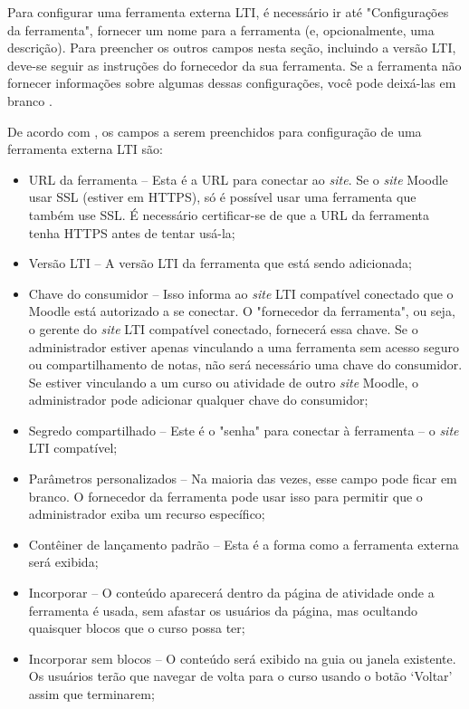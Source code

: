 Para configurar uma ferramenta externa LTI, é necessário ir até "Configurações da ferramenta", fornecer um nome para a ferramenta (e, opcionalmente, uma descrição). Para preencher os outros campos nesta seção, incluindo a versão LTI, deve-se seguir as instruções do fornecedor da sua ferramenta. Se a ferramenta não fornecer informações sobre algumas dessas configurações, você pode deixá-las em branco \cite{moodle}.

De acordo com \textcite{moodle}, os campos a serem preenchidos para configuração de uma ferramenta externa LTI são:

\begin{itemize}
    \item URL da ferramenta – Esta é a URL para conectar ao \textit{site}. Se o \textit{site} Moodle usar SSL (estiver em HTTPS), só é possível usar uma ferramenta que também use SSL. É necessário certificar-se de que a URL da ferramenta tenha HTTPS antes de tentar usá-la;
    \item Versão LTI – A versão LTI da ferramenta que está sendo adicionada; 
    \item Chave do consumidor – Isso informa ao \textit{site} LTI compatível conectado que o Moodle está autorizado a se conectar. O "fornecedor da ferramenta", ou seja, o gerente do \textit{site} LTI compatível conectado, fornecerá essa chave. Se o administrador estiver apenas vinculando a uma ferramenta sem acesso seguro ou compartilhamento de notas, não será necessário uma chave do consumidor. Se estiver vinculando a um curso ou atividade de outro \textit{site} Moodle, o administrador pode adicionar qualquer chave do consumidor;
    \item Segredo compartilhado – Este é o "senha" para conectar à ferramenta – o \textit{site} LTI compatível;
    \item Parâmetros personalizados – Na maioria das vezes, esse campo pode ficar em branco. O fornecedor da ferramenta pode usar isso para permitir que o administrador exiba um recurso específico;
    \item Contêiner de lançamento padrão – Esta é a forma como a ferramenta externa será exibida;
    \item Incorporar – O conteúdo aparecerá dentro da página de atividade onde a ferramenta é usada, sem afastar os usuários da página, mas ocultando quaisquer blocos que o curso possa ter;
    \item Incorporar sem blocos – O conteúdo será exibido na guia ou janela existente. Os usuários terão que navegar de volta para o curso usando o botão ‘Voltar’ assim que terminarem;

\end{itemize}
